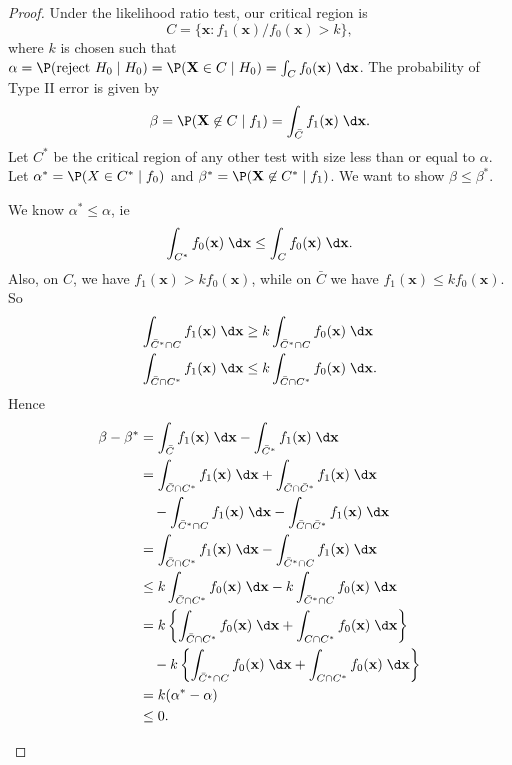 \documentclass[a4paper]{article}
\begin{document}
\begin{proof}
  Under the likelihood ratio test, our critical region is
  \[
    C = \{\mathbf{x}: f_1(\mathbf{x})/f_0(\mathbf{x}) > k\},
  \]
  where $k$ is chosen such that $\alpha=\P(\text{reject }H_0\mid H_0) = \P(\mathbf{X}\in C\mid H_0) = \int_C f_0(\mathbf{x})\;\d \mathbf{x}$. The probability of Type II error is given by
  \[
    \beta = \P(\mathbf{X}\not\in C\mid f_1) = \int_{\bar C}f_1(\mathbf{x})\;\d \mathbf{x}.
  \]
  Let $C^*$ be the critical region of any other test with size less than or equal to $\alpha$. Let $\alpha^* = \P(X\in C^*\mid f_0)$ and $\beta^* = \P(\mathbf{X}\not\in C^*\mid f_1)$. We want to show $\beta \leq \beta^*$.

  We know $\alpha^* \leq \alpha$, ie
  \[
    \int_{C^*}f_0(\mathbf{x})\;\d \mathbf{x}\leq \int_Cf_0(\mathbf{x}) \;\d \mathbf{x}.
  \]
  Also, on $C$, we have $f_1(\mathbf{x}) > kf_0(\mathbf{x})$, while on $\bar C$ we have $f_1(\mathbf{x}) \leq kf_0(\mathbf{x})$. So
  \begin{align*}
    \int_{\bar C^*\cap C} f_1(\mathbf{x}) \;\d \mathbf{x} &\geq k\int_{\bar C^*\cap C}f_0(\mathbf{x}) \;\d \mathbf{x}\\
    \int_{\bar C\cap C^*}f_1(\mathbf{x}) \;\d \mathbf{x} &\leq k\int_{\bar C\cap C^*}f_0 (\mathbf{x})\;\d \mathbf{x}.
  \end{align*}
  Hence
  \begin{align*}
    \beta - \beta^* &= \int_{\bar C}f_1(\mathbf{x}) \;\d \mathbf{x} - \int_{\bar C^*}f_1(\mathbf{x})\;\d \mathbf{x}\\
    &= \int_{\bar C\cap C^*} f_1(\mathbf{x}) \;\d \mathbf{x} + \int_{\bar C\cap \bar C^*}f_1(\mathbf{x})\;\d \mathbf{x} \\
    &\quad - \int_{\bar C^*\cap C} f_1(\mathbf{x}) \;\d \mathbf{x} - \int_{\bar C\cap \bar C^*}f_1(\mathbf{x})\;\d \mathbf{x}\\
    &= \int_{\bar C \cap C^*}f_1(\mathbf{x})\;\d \mathbf{x} - \int_{\bar C^*\cap C}f_1(\mathbf{x})\;\d \mathbf{x}\\
    &\leq k\int_{\bar C \cap C^*}f_0(\mathbf{x})\;\d \mathbf{x} - k\int_{\bar C^*\cap C}f_0(\mathbf{x})\;\d \mathbf{x}\\
    &= k\left\{\int_{\bar C\cap C^*}f_0(\mathbf{x})\;\d \mathbf{x} + \int_{C \cap C^*}f_0(\mathbf{x})\;\d \mathbf{x}\right\} \\
    &\quad- k\left\{\int_{\bar C^*\cap C}f_0(\mathbf{x})\;\d \mathbf{x} + \int_{C\cap C^*}f_0(\mathbf{x})\;\d \mathbf{x}\right\}\\
    &= k(\alpha^* - \alpha)\\
    &\leq 0.
  \end{align*}
  \begin{center}
\end{center}
\end{proof}
\end{document}
